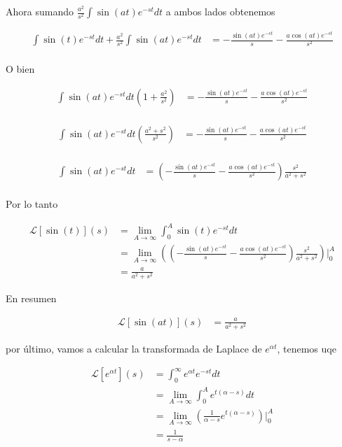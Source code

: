 \documentclass{article}
\theoremstyle{plain}
\theoremstyle{definition}
\begin{document}
Ahora sumando $\displaystyle \frac{a^2}{s^2} \int \sin(at)e^{-st} dt $ a ambos lados obtenemos

\begin{align*}
\displaystyle \int \sin(t)e^{-st}dt + \frac{a^2}{s^2} \int \sin(at)e^{-st} dt &= -\frac{\sin(at)e^{-st}}{s} -\frac{a\cos(at)e^{-st}}{s^2} \\
\end{align*}

O bien


\begin{align*}
\displaystyle  \int \sin(at)e^{-st} dt  \left( 1+ \frac{a^2}{s^2}\right) &= -\frac{\sin(at)e^{-st}}{s} -\frac{a\cos(at)e^{-st}}{s^2} \\
\end{align*}

\begin{align*}
\displaystyle  \int \sin(at)e^{-st} dt  \left( \frac{a^2+s^2}{s^2}\right) &= -\frac{\sin(at)e^{-st}}{s}  -\frac{a\cos(at)e^{-st}}{s^2} \\
\end{align*}


\begin{align*}
\displaystyle  \int \sin(at)e^{-st} dt &= \left( -\frac{\sin(at)e^{-st}}{s} -\frac{a\cos(at)e^{-st}}{s^2} \right) \frac{s^2}{a^2+s^2}\\
\end{align*}

Por lo tanto


\begin{align*}
\displaystyle \mathcal{L}[\sin(t)](s) &= \lim_{A \to \infty} \int_0^A \sin(t)e^{-st}  dt \\
&= \lim_{A \to \infty} \left( \left( -\frac{\sin(at)e^{-st}}{s} -\frac{a\cos(at)e^{-st}}{s^2} \right) \frac{s^2}{a^2+s^2}\right) \bigg|_0^A \\
&= \frac{a}{a^2+s^2}
\end{align*}


En resumen

\begin{align*}
\displaystyle \mathcal{L}[\sin(at)](s) &= \frac{a}{a^2+s^2}
\end{align*}


por último, vamos a calcular la transformada de Laplace de $e^{\alpha t}$, tenemos uqe

\begin{align*}
\displaystyle \mathcal{L}[e^{\alpha t}](s) &= \int_0^\infty e^{\alpha t} e^{-st} dt \\
&= \lim_{A \to \infty} \int_0^A e^{t(\alpha-s)} dt \\
&= \lim_{A \to \infty} \left( \frac{1}{\alpha -s} e^{t(\alpha-s)} \right)\bigg|_0^A  \\
&= \frac{1}{s-\alpha}
\end{align*}
\end{document}

